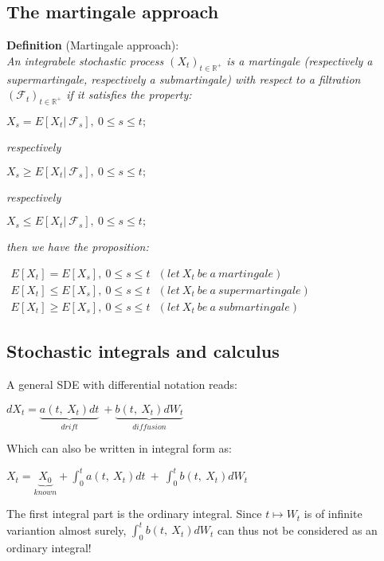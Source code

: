 \documentclass{article}
\begin{document}
\subsection{The martingale approach}

\textbf{Definition} (Martingale approach): \\
\textit{An integrabele stochastic process  $(X_{t})_{t\in \mathbb{R}^{+}}$ is a martingale (respectively a supermartingale, respectively a submartingale) with respect to a filtration $(\mathscr{F}_{t})_{t\in \mathbb{R}^{+}}$ if it satisfies the property:}

\begin{center}
	$X_{s}=E\left[ X_{t}|\  \mathscr{F}_{s} \right]  ,\  0\leqslant s\leqslant t;$
\end{center}
\textit{respectively}
\begin{center}
	$X_{s}\geqslant E\left[ X_{t}|\  \mathscr{F}_{s} \right]  ,\  0\leqslant s\leqslant t;$
\end{center}
\textit{respectively}
\begin{center}
	$X_{s}\leqslant E\left[ X_{t}|\  \mathscr{F}_{s} \right]  ,\  0\leqslant s\leqslant t;$
\end{center}
\textit{then we have the proposition:}
\begin{center}
	$\begin{array}{l}E\left[ X_{t}\right]  =E\left[ X_{s}\right]  ,\  0\leqslant s\leqslant t\  \  \  (let\  X_{t}\  be\  a\  martingale)\\ E\left[ X_{t}\right]  \leq E\left[ X_{s}\right]  ,\  0\leqslant s\leqslant t\  \  \  (let\  X_{t}\  be\  a\  supermartingale)\\ E\left[ X_{t}\right]  \geqslant E\left[ X_{s}\right]  ,\  0\leqslant s\leqslant t\  \  \  (let\  X_{t}\  be\  a\  submartingale)\end{array}$
\end{center}

\subsection{Stochastic integrals and calculus}
A general SDE with differential notation reads:
\begin{center}
	$dX_{t}=\underbrace{a\left( t,\  X_{t}\right)  dt}_{drift} \  +\underbrace{b\left( t,\  X_{t}\right)  dW_{t}}_{diffusion} $
\end{center}
Which can also be written in integral form as:
\begin{center}
	$X_{t}=\underbrace{X_{0}}_{known} +\int^{t}_{0} a\left( t,\  X_{t}\right)  dt\  +\  \int^{t}_{0} b\left( t,\  X_{t}\right)  dW_{t}$
\end{center}
The first integral part is the ordinary integral. Since $t\longmapsto W_{t}$ is of infinite variantion almost surely, $\int^{t}_{0} b\left( t,\  X_{t}\right)  dW_{t}$ can thus not be considered as an ordinary integral!
\\
\end{document}
